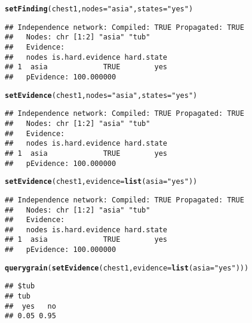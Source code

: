 \documentclass[10pt]{article}\usepackage[]{graphicx}\usepackage[]{color}
\makeatletter
\newcommand{\hlstr}[1]{\textcolor[rgb]{0.192,0.494,0.8}{#1}}%
\newcommand{\hlstd}[1]{\textcolor[rgb]{0.345,0.345,0.345}{#1}}%
\newcommand{\hlkwc}[1]{\textcolor[rgb]{0.333,0.667,0.333}{#1}}%
\newcommand{\hlkwd}[1]{\textcolor[rgb]{0.737,0.353,0.396}{\textbf{#1}}}%
\newenvironment{kframe}{%
 \def\at@end@of@kframe{}%
 \ifinner\ifhmode%
  \def\at@end@of@kframe{\end{minipage}}%
  \begin{minipage}{\columnwidth}%
 \fi\fi%
 \def\FrameCommand##1{\hskip\@totalleftmargin \hskip-\fboxsep
 \colorbox{shadecolor}{##1}\hskip-\fboxsep
     \hskip-\linewidth \hskip-\@totalleftmargin \hskip\columnwidth}%
 \MakeFramed {\advance\hsize-\width
   \@totalleftmargin\z@ \linewidth\hsize
   \@setminipage}}%
 {\par\unskip\endMakeFramed%
 \at@end@of@kframe}
\newenvironment{knitrout}{}{} %
\makeatother
\begin{document}
\begin{knitrout}
\color{fgcolor}\begin{kframe}
\begin{alltt}
\hlkwd{setFinding}\hlstd{(chest1,} \hlkwc{nodes}\hlstd{=}\hlstr{"asia"}\hlstd{,} \hlkwc{states}\hlstd{=}\hlstr{"yes"}\hlstd{)}
\end{alltt}
\begin{verbatim}
## Independence network: Compiled: TRUE Propagated: TRUE 
##   Nodes: chr [1:2] "asia" "tub"
##   Evidence:
##   nodes is.hard.evidence hard.state
## 1  asia             TRUE        yes
##   pEvidence: 100.000000
\end{verbatim}
\begin{alltt}
\hlkwd{setEvidence}\hlstd{(chest1,} \hlkwc{nodes}\hlstd{=}\hlstr{"asia"}\hlstd{,} \hlkwc{states}\hlstd{=}\hlstr{"yes"}\hlstd{)}
\end{alltt}
\begin{verbatim}
## Independence network: Compiled: TRUE Propagated: TRUE 
##   Nodes: chr [1:2] "asia" "tub"
##   Evidence:
##   nodes is.hard.evidence hard.state
## 1  asia             TRUE        yes
##   pEvidence: 100.000000
\end{verbatim}
\begin{alltt}
\hlkwd{setEvidence}\hlstd{(chest1,} \hlkwc{evidence}\hlstd{=}\hlkwd{list}\hlstd{(}\hlkwc{asia}\hlstd{=}\hlstr{"yes"}\hlstd{))}
\end{alltt}
\begin{verbatim}
## Independence network: Compiled: TRUE Propagated: TRUE 
##   Nodes: chr [1:2] "asia" "tub"
##   Evidence:
##   nodes is.hard.evidence hard.state
## 1  asia             TRUE        yes
##   pEvidence: 100.000000
\end{verbatim}
\end{kframe}
\end{knitrout}

\begin{knitrout}
\color{fgcolor}\begin{kframe}
\begin{alltt}
\hlkwd{querygrain}\hlstd{(}\hlkwd{setEvidence}\hlstd{(chest1,} \hlkwc{evidence}\hlstd{=}\hlkwd{list}\hlstd{(}\hlkwc{asia}\hlstd{=}\hlstr{"yes"}\hlstd{)))}
\end{alltt}
\begin{verbatim}
## $tub
## tub
##  yes   no 
## 0.05 0.95
\end{verbatim}
\end{kframe}
\end{knitrout}
\end{document}
